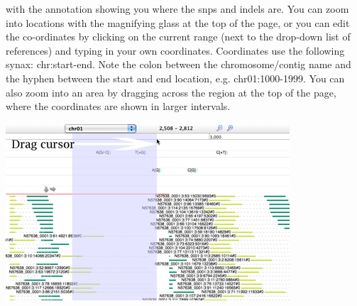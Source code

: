 \documentclass[12pt,a4paper]{article}
\begin{document}
\begin{enumerate}
          with the annotation showing you where the snps and indels
          are. You can zoom into locations with the magnifying glass
          at the top of the page, or you can edit the co-ordinates by
          clicking on the current range (next to the drop-down list of
          references) and typing in your own coordinates. Coordinates
          use the following synax: chr:start-end. Note the colon
          between the chromosome/contig name and the hyphen between
          the start and end location, e.g. chr01:1000-1999. You can
          also zoom into an area by dragging across the region at the
          top of the page, where the coordinates are shown in larger
          intervals.
\end{enumerate}


\includegraphics{images/DragZoom.jpg}
\end{document}
